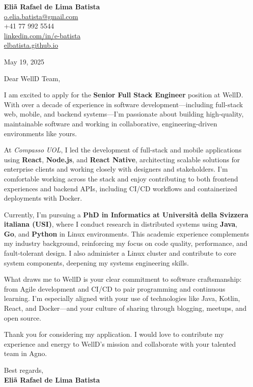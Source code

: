 \documentclass[11pt]{article}
\begin{document}
\noindent
\textbf{Eliã Rafael de Lima Batista} \\
\href{mailto:o.elia.batista@gmail.com}{o.elia.batista@gmail.com} \\
+41 77 992 5544 \\
\href{https://linkedin.com/in/e-batista}{linkedin.com/in/e-batista} \\
\href{https://elbatista.github.io}{elbatista.github.io}

\vspace{1em}

May 19, 2025 \\
\vspace{1em}

Dear WellD Team,

\vspace{1em}

I am excited to apply for the \textbf{Senior Full Stack Engineer} position at WellD. With over a decade of experience in software development—including full-stack web, mobile, and backend systems—I’m passionate about building high-quality, maintainable software and working in collaborative, engineering-driven environments like yours.

At \textit{Compasso UOL}, I led the development of full-stack and mobile applications using \textbf{React}, \textbf{Node.js}, and \textbf{React Native}, architecting scalable solutions for enterprise clients and working closely with designers and stakeholders. I’m comfortable working across the stack and enjoy contributing to both frontend experiences and backend APIs, including CI/CD workflows and containerized deployments with Docker.

Currently, I’m pursuing a \textbf{PhD in Informatics at Università della Svizzera italiana (USI)}, where I conduct research in distributed systems using \textbf{Java}, \textbf{Go}, and \textbf{Python} in Linux environments. This academic experience complements my industry background, reinforcing my focus on code quality, performance, and fault-tolerant design. I also administer a Linux cluster and contribute to core system components, deepening my systems engineering skills.

What draws me to WellD is your clear commitment to software craftsmanship: from Agile development and CI/CD to pair programming and continuous learning. I’m especially aligned with your use of technologies like Java, Kotlin, React, and Docker—and your culture of sharing through blogging, meetups, and open source.

\vspace{1em}

Thank you for considering my application. I would love to contribute my experience and energy to WellD’s mission and collaborate with your talented team in Agno.

\vspace{1em}

Best regards, \\
\textbf{Eliã Rafael de Lima Batista}
\end{document}
